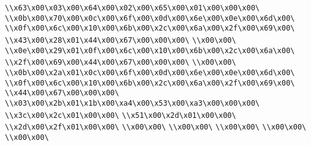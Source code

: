 \verb|\\x63\x00\x03\x00\x64\x00\x02\x00\x65\x00\x01\x00\x00\x00\|\newline
\verb|\\x0b\x00\x70\x00\x0c\x00\x6f\x00\x0d\x00\x6e\x00\x0e\x00\x6d\x00\|\newline
\verb|\\x0f\x00\x6c\x00\x10\x00\x6b\x00\x2c\x00\x6a\x00\x2f\x00\x69\x00\|\newline
\verb|\\x43\x00\x28\x01\x44\x00\x67\x00\x00\x00\|\newline
\verb|\\x00\x00\|\newline
\verb|\\x0e\x00\x29\x01\x0f\x00\x6c\x00\x10\x00\x6b\x00\x2c\x00\x6a\x00\|\newline
\verb|\\x2f\x00\x69\x00\x44\x00\x67\x00\x00\x00\|\newline
\verb|\\x00\x00\|\newline
\verb|\\x0b\x00\x2a\x01\x0c\x00\x6f\x00\x0d\x00\x6e\x00\x0e\x00\x6d\x00\|\newline
\verb|\\x0f\x00\x6c\x00\x10\x00\x6b\x00\x2c\x00\x6a\x00\x2f\x00\x69\x00\|\newline
\verb|\\x44\x00\x67\x00\x00\x00\|\newline
\verb|\\x03\x00\x2b\x01\x1b\x00\xa4\x00\x53\x00\xa3\x00\x00\x00\|\newline
\verb|\\x3c\x00\x2c\x01\x00\x00\|\newline
\verb|\\x51\x00\x2d\x01\x00\x00\|\newline
\verb|\\x2d\x00\x2f\x01\x00\x00\|\newline
\verb|\\x00\x00\|\newline
\verb|\\x00\x00\|\newline
\verb|\\x00\x00\|\newline
\verb|\\x00\x00\|\newline
\verb|\\x00\x00\|\newline
